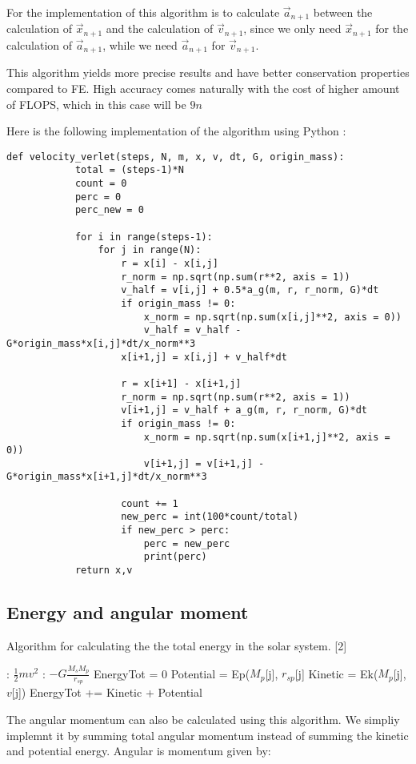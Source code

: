 \documentclass{article}
\begin{document}
For the implementation of this algorithm is to calculate $\vec{a}_{n+1}$ between the calculation of $\vec{x}_{n+1}$ and the calculation of $\vec{v}_{n+1}$, since we only need $\vec{x}_{n+1}$  for the calculation of  $\vec{a}_{n+1}$, while we need  $\vec{a}_{n+1}$ for  $\vec{v}_{n+1}$.

This algorithm yields more precise results and have better conservation properties compared to FE. High accuracy  comes naturally  with the cost of higher amount of FLOPS, which in this case will be  $9n$ 

Here is the following implementation of the algorithm using Python :
\begin{lstlisting}
def velocity_verlet(steps, N, m, x, v, dt, G, origin_mass):
            total = (steps-1)*N
            count = 0
            perc = 0
            perc_new = 0

            for i in range(steps-1):
                for j in range(N):
                    r = x[i] - x[i,j]
                    r_norm = np.sqrt(np.sum(r**2, axis = 1))
                    v_half = v[i,j] + 0.5*a_g(m, r, r_norm, G)*dt
                    if origin_mass != 0:
                        x_norm = np.sqrt(np.sum(x[i,j]**2, axis = 0))
                        v_half = v_half - G*origin_mass*x[i,j]*dt/x_norm**3
                    x[i+1,j] = x[i,j] + v_half*dt

                    r = x[i+1] - x[i+1,j]
                    r_norm = np.sqrt(np.sum(r**2, axis = 1))
                    v[i+1,j] = v_half + a_g(m, r, r_norm, G)*dt
                    if origin_mass != 0:
                        x_norm = np.sqrt(np.sum(x[i+1,j]**2, axis = 0))
                        v[i+1,j] = v[i+1,j] - G*origin_mass*x[i+1,j]*dt/x_norm**3

                    count += 1
                    new_perc = int(100*count/total)
                    if new_perc > perc:
                        perc = new_perc
                        print(perc)
            return x,v

\end{lstlisting}

\subsection{Energy and angular moment }


\begin{algorithm}[H]
\caption{Algorithm for calculating the the total energy in the solar system. [2]} 
	\begin{algorithmic}[1]
		: 
		\State \Return $\tfrac{1}{2}mv^{2}$ \EndFunction
		:
		\State \Return $-G\tfrac{M_{s}M_{p}}{r_{sp}}$ \EndFunction
		\State EnergyTot = 0
   			\State Potential = Ep($M_{p}$[j], $r_{sp}$[j]
			\State Kinetic = Ek($M_{p}$[j], $v$[j])
			\State EnergyTot += Kinetic + Potential 
		\EndFor
	\end{algorithmic}
	\label{alg:EC}
\end{algorithm} 
The angular momentum can also be calculated using this algorithm. We simpliy implemnt it by summing total angular momentum instead of summing the kinetic and potential energy. Angular is momentum given by:
\end{document}
